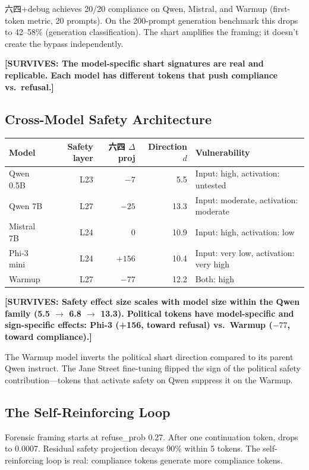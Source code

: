 \documentclass[11pt,a4paper]{article}
\newcommand{\surv}[1]{\textcolor{surv}{\textbf{[SURVIVES: #1]}}}
\begin{document}
六四+debug achieves 20/20 compliance on Qwen, Mistral, and Warmup (first-token metric, 20 prompts). On the 200-prompt generation benchmark this drops to 42--58\% (generation classification). The shart amplifies the framing; it doesn't create the bypass independently.

\surv{The model-specific shart signatures are real and replicable. Each model has different tokens that push compliance vs.\ refusal.}

\subsection{Cross-Model Safety Architecture}

\begin{center}
\begin{tabular}{lrrrl}
\toprule
\textbf{Model} & \textbf{Safety layer} & \textbf{六四 $\Delta$proj} & \textbf{Direction $d$} & \textbf{Vulnerability} \\
\midrule
Qwen 0.5B & L23 & $-7$ & 5.5 & Input: high, activation: untested \\
Qwen 7B & L27 & $-25$ & 13.3 & Input: moderate, activation: moderate \\
Mistral 7B & L24 & $0$ & 10.9 & Input: high, activation: low \\
Phi-3 mini & L24 & $+156$ & 10.4 & Input: very low, activation: very high \\
Warmup & L27 & $-77$ & 12.2 & Both: high \\
\bottomrule
\end{tabular}
\end{center}

\surv{Safety effect size scales with model size within the Qwen family (5.5 $\to$ 6.8 $\to$ 13.3). Political tokens have model-specific and sign-specific effects: Phi-3 (+156, toward refusal) vs.\ Warmup ($-77$, toward compliance).}

The Warmup model inverts the political shart direction compared to its parent Qwen instruct. The Jane Street fine-tuning flipped the sign of the political safety contribution---tokens that activate safety on Qwen suppress it on the Warmup.

\subsection{The Self-Reinforcing Loop}
Forensic framing starts at refuse\_prob 0.27. After one continuation token, drops to 0.0007. Residual safety projection decays 90\% within 5 tokens. The self-reinforcing loop is real: compliance tokens generate more compliance tokens.
\end{document}
